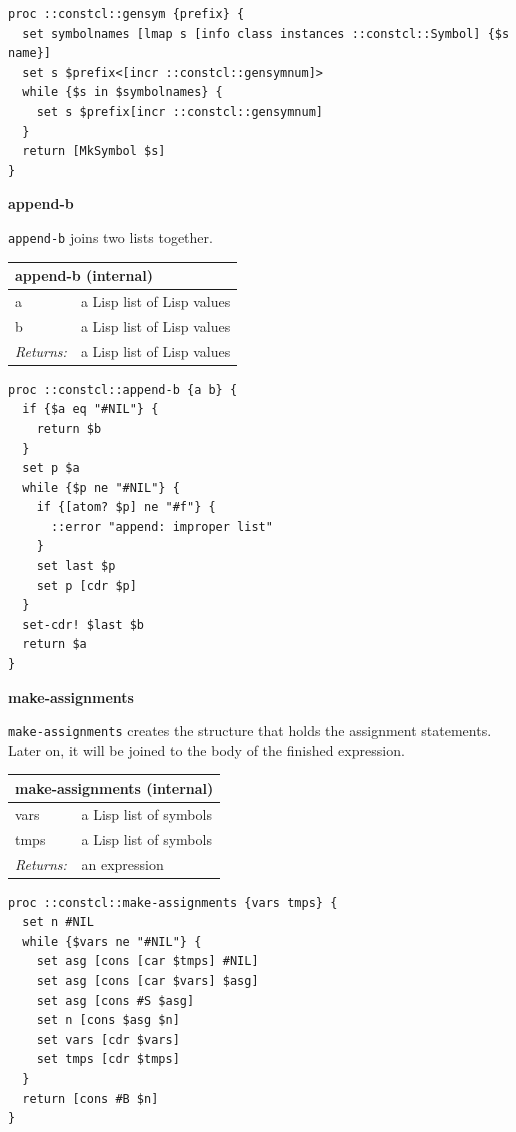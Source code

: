 \documentclass[twoside,9pt]{report}
\begin{document}
\noindent\makebox[\linewidth]{\rule{\linewidth}{0.4pt}}
\begin{lstlisting}
proc ::constcl::gensym {prefix} {
  set symbolnames [lmap s [info class instances ::constcl::Symbol] {$s name}]
  set s $prefix<[incr ::constcl::gensymnum]>
  while {$s in $symbolnames} {
    set s $prefix[incr ::constcl::gensymnum]
  }
  return [MkSymbol $s]
}
\end{lstlisting}
\noindent\makebox[\linewidth]{\rule{\linewidth}{0.4pt}}

\textbf{append-b}


\texttt{append-b} joins two lists together.

\begin{tabular}{ |l l| }
\hline
\multicolumn{2}{|l|}{append-b (internal)} \\
\hline
a & a Lisp list of Lisp values \\
b & a Lisp list of Lisp values \\
\textit{Returns:} & a Lisp list of Lisp values \\
\hline
\end{tabular}

\noindent\makebox[\linewidth]{\rule{\linewidth}{0.4pt}}
\begin{lstlisting}
proc ::constcl::append-b {a b} {
  if {$a eq "#NIL"} {
    return $b
  }
  set p $a
  while {$p ne "#NIL"} {
    if {[atom? $p] ne "#f"} {
      ::error "append: improper list"
    }
    set last $p
    set p [cdr $p]
  }
  set-cdr! $last $b
  return $a
}
\end{lstlisting}
\noindent\makebox[\linewidth]{\rule{\linewidth}{0.4pt}}

\textbf{make-assignments}


\texttt{make-assignments} creates the structure that holds the assignment statements. Later on, it will be joined to the body of the finished expression.

\begin{tabular}{ |l l| }
\hline
\multicolumn{2}{|l|}{make-assignments (internal)} \\
\hline
vars & a Lisp list of symbols \\
tmps & a Lisp list of symbols \\
\textit{Returns:} & an expression \\
\hline
\end{tabular}

\noindent\makebox[\linewidth]{\rule{\linewidth}{0.4pt}}
\begin{lstlisting}
proc ::constcl::make-assignments {vars tmps} {
  set n #NIL
  while {$vars ne "#NIL"} {
    set asg [cons [car $tmps] #NIL]
    set asg [cons [car $vars] $asg]
    set asg [cons #S $asg]
    set n [cons $asg $n]
    set vars [cdr $vars]
    set tmps [cdr $tmps]
  }
  return [cons #B $n]
}
\end{lstlisting}
\noindent\makebox[\linewidth]{\rule{\linewidth}{0.4pt}}
\end{document}
